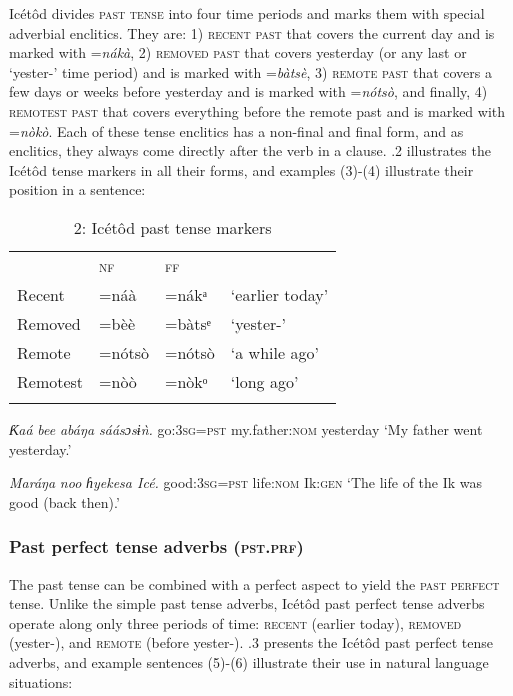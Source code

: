 Icétôd divides \textsc{past tense} into four time periods and marks them with special adverbial enclitics. They are: 1) \textsc{recent past} that covers the current day and is marked with =\textit{nákà}, 2) \textsc{removed past} that covers yesterday (or any last or ‘yester-’ time period) and is marked with =\textit{bàtsè}, 3) \textsc{remote past} that covers a few days or weeks before yesterday and is marked with =\textit{nótsò}, and finally, 4) \textsc{remotest past} that covers everything before the remote past and is marked with =\textit{nòkò}. Each of these tense enclitics has a non-final and final form, and as enclitics, they always come directly after the verb in a clause. .2 illustrates the Icétôd tense markers in all their forms, and examples (3)-(4) illustrate their position in a sentence:


\begin{table}
\caption{2: Icétôd past tense markers}
\label{tab:9}


\begin{tabularx}{\textwidth}{XXXX} & \textsc{nf} & \textsc{ff} & \\
\lsptoprule
Recent & =náà & =nákᵃ & ‘earlier today’\\
Removed & =bèè & =bàtsᵉ & ‘yester-’\\
Remote & =nótsò & =nótsò & ‘a while ago’\\
Remotest & =nòò & =nòkᵒ & ‘long ago’\\
\lspbottomrule
\end{tabularx}
\end{table}



\textit{Ƙ}\textit{aá} \textit{bee}\textit{   abáŋa     sáásɔsɨǹ.}
go:\textsc{3sg}=\textsc{pst}   my.father:\textsc{nom}   yesterday
‘My father went yesterday.’




\textit{Maráŋa} \textit{noo}\textit{   ɦyekesa   Icé.}
good:\textsc{3sg}=\textsc{pst}   life:\textsc{nom}   Ik:\textsc{gen}
‘The life of the Ik was good (back then).’




\subsubsection{Past perfect tense adverbs (\textsc{pst.prf})}

The past tense can be combined with a perfect aspect to yield the \textsc{past perfect} tense. Unlike the simple past tense adverbs, Icétôd past perfect tense adverbs operate along only three periods of time: \textsc{recent} (earlier today), \textsc{removed} (yester-), and \textsc{remote} (before yester-). .3 presents the Icétôd past perfect tense adverbs, and example sentences (5)-(6) illustrate their use in natural language situations:


